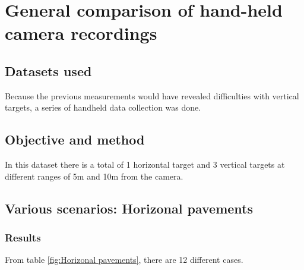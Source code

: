 \section{General comparison of hand-held camera recordings}

\subsection{Datasets used}

Because the previous measurements would have revealed difficulties with vertical targets, a series of handheld data collection was done. 

\subsection{Objective and method}

In this dataset there is a total of 1 horizontal target and 3 vertical targets at different ranges of 5m and 10m from the camera. 

\subsection{Various scenarios: Horizonal pavements }

\subsubsection{Results}

From table \ref{fig:Horizonal pavements}, there are 12 different cases. 

